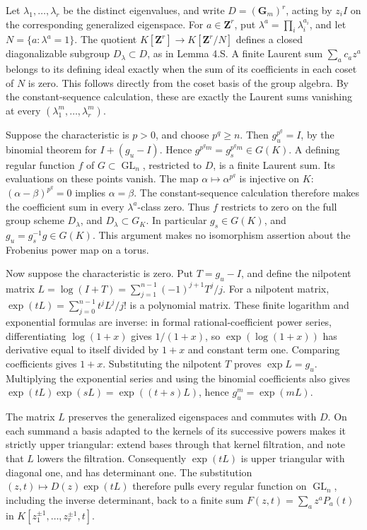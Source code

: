 \documentclass[11pt,a4paper,openany]{report}
\begin{document}
Let \(\lambda_1,\ldots,\lambda_r\) be the distinct eigenvalues, and write \(D=(\mathbf G_m)^r\), acting by \(z_iI\) on the corresponding generalized eigenspace. For \(a\in\mathbf Z^r\), put \(\lambda^a=\prod_i\lambda_i^{a_i}\), and let \(N=\{a:\lambda^a=1\}\). The quotient \(K[\mathbf Z^r]\to K[\mathbf Z^r/N]\) defines a closed diagonalizable subgroup \(D_\lambda\subset D\), as in Lemma 4.S. A finite Laurent sum \(\sum_a c_a z^a\) belongs to its defining ideal exactly when the sum of its coefficients in each coset of \(N\) is zero. This follows directly from the coset basis of the group algebra. By the constant-sequence calculation, these are exactly the Laurent sums vanishing at every \((\lambda_1^m,\ldots,\lambda_r^m)\).

Suppose the characteristic is \(p>0\), and choose \(p^q\geq n\). Then \(g_u^{p^q}=I\), by the binomial theorem for \(I+(g_u-I)\). Hence \(g^{p^qm}=g_s^{p^qm}\in G(K)\). A defining regular function \(f\) of \(G\subset\operatorname{GL}_n\), restricted to \(D\), is a finite Laurent sum. Its evaluations on these points vanish. The map \(\alpha\mapsto\alpha^{p^q}\) is injective on \(K\): \((\alpha-\beta)^{p^q}=0\) implies \(\alpha=\beta\). The constant-sequence calculation therefore makes the coefficient sum in every \(\lambda^a\)-class zero. Thus \(f\) restricts to zero on the full group scheme \(D_\lambda\), and \(D_\lambda\subset G_K\). In particular \(g_s\in G(K)\), and \(g_u=g_s^{-1}g\in G(K)\). This argument makes no isomorphism assertion about the Frobenius power map on a torus.

Now suppose the characteristic is zero. Put \(T=g_u-I\), and define the nilpotent matrix \(L=\log(I+T)=\sum_{j=1}^{n-1}(-1)^{j+1}T^j/j\). For a nilpotent matrix, \(\exp(tL)=\sum_{j=0}^{n-1}t^jL^j/j!\) is a polynomial matrix. These finite logarithm and exponential formulas are inverse: in formal rational-coefficient power series, differentiating \(\log(1+x)\) gives \(1/(1+x)\), so \(\exp(\log(1+x))\) has derivative equal to itself divided by \(1+x\) and constant term one. Comparing coefficients gives \(1+x\). Substituting the nilpotent \(T\) proves \(\exp L=g_u\). Multiplying the exponential series and using the binomial coefficients also gives \(\exp(tL)\exp(sL)=\exp((t+s)L)\), hence \(g_u^m=\exp(mL)\).

The matrix \(L\) preserves the generalized eigenspaces and commutes with \(D\). On each summand a basis adapted to the kernels of its successive powers makes it strictly upper triangular: extend bases through that kernel filtration, and note that \(L\) lowers the filtration. Consequently \(\exp(tL)\) is upper triangular with diagonal one, and has determinant one. The substitution \((z,t)\mapsto D(z)\exp(tL)\) therefore pulls every regular function on \(\operatorname{GL}_n\), including the inverse determinant, back to a finite sum \(F(z,t)=\sum_a z^aP_a(t)\) in \(K[z_1^{\pm1},\ldots,z_r^{\pm1},t]\).
\end{document}
